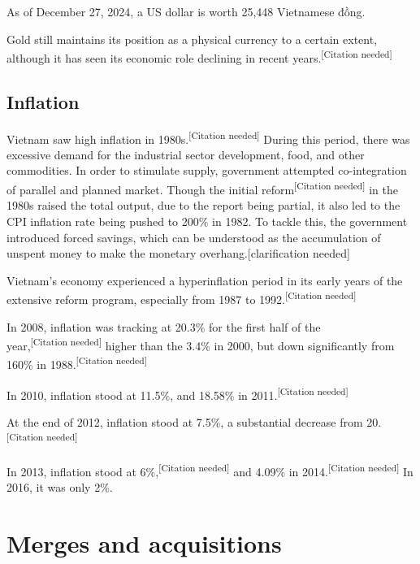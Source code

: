 \documentclass{article}
\begin{document}
As of December 27, 2024, a US dollar is worth 25,448 Vietnamese đồng.

Gold still maintains its position as a physical currency to a certain extent, although it has seen its economic role declining in recent years.\textsuperscript{[Citation needed]}

\subsection*{Inflation}

Vietnam saw high inflation in 1980s.\textsuperscript{[Citation needed]} During this period, there was excessive demand for the industrial sector development, food, and other commodities. In order to stimulate supply, government attempted co-integration of parallel and planned market. Though the initial reform\textsuperscript{[Citation needed]} in the 1980s raised the total output, due to the report being partial, it also led to the CPI inflation rate being pushed to 200\% in 1982. To tackle this, the government introduced forced savings, which can be understood as the accumulation of unspent money to make the monetary overhang.[clarification needed]

Vietnam's economy experienced a hyperinflation period in its early years of the extensive reform program, especially from 1987 to 1992.\textsuperscript{[Citation needed]}

In 2008, inflation was tracking at 20.3\% for the first half of the \\year,\textsuperscript{[Citation needed]} higher than the 3.4\% in 2000, but down significantly from 160\% in 1988.\textsuperscript{[Citation needed]}

In 2010, inflation stood at 11.5\%, and 18.58\% in 2011.\textsuperscript{[Citation needed]}

At the end of 2012, inflation stood at 7.5\%, a substantial decrease from 20.\textsuperscript{[Citation needed]}

In 2013, inflation stood at 6\%,\textsuperscript{[Citation needed]} and 4.09\% in 2014.\textsuperscript{[Citation needed]} In 2016, it was only 2\%.

\section*{Merges and acquisitions}
\end{document}
